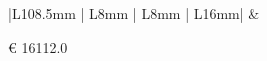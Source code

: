 \documentclass[a4paper]{article}
\begin{document}
                                           \noindent\begin{tabular}{|L{108.5mm} | L{8mm} | L{8mm} |  L{16mm}| }
                                           \hline
                                            &
                                           \vspace{2.5mm}
                                           \begin{spacing}{0}
                                             \euro\hfill
                                        16112.0
                                   \end{spacing}\\
                                   \hline
                                

\end{tabular}
\end{document}
